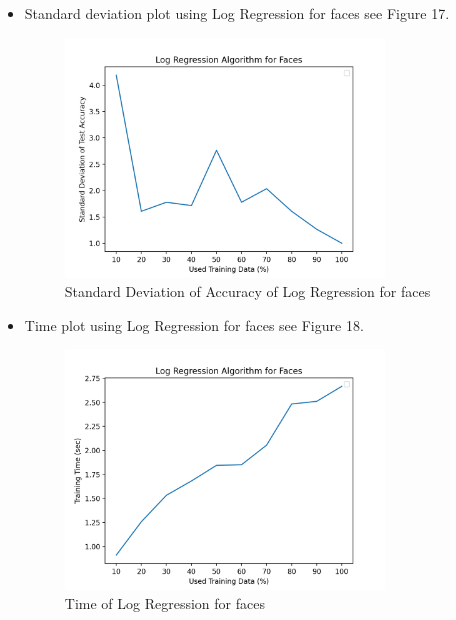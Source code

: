 \documentclass{article}
\begin{document}
\begin{itemize}
    \item Standard deviation plot using Log Regression for faces see Figure 17.
    \begin{figure}
        \centering
        \includegraphics[width=0.8\textwidth]{logFaSd.png}
        \caption{Standard Deviation of Accuracy of Log Regression for faces}
    \end{figure}
    
    \item Time plot using Log Regression for faces see Figure 18.
    \begin{figure}
        \centering
        \includegraphics[width=0.8\textwidth]{logFaTime.png}
        \caption{Time of Log Regression for faces}
    \end{figure}
\end{itemize}
\end{document}
